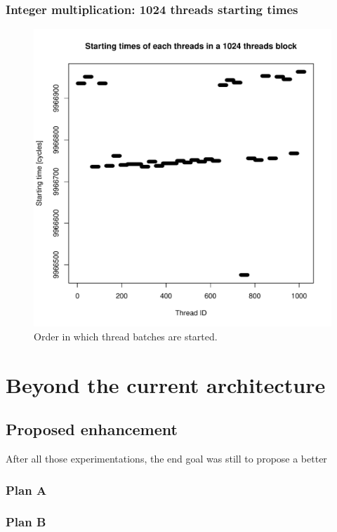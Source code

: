 \documentclass{report}
\def \scalingfactor{.8}
\begin{document}
	\subsection{Integer multiplication: 1024 threads starting times}
    \begin{figure}[H]
    		\centering
		\vspace{-20pt}
	    	\includegraphics[width=\scalingfactor\linewidth]{"graphics/starting_times_ratio31"}
	    	\vspace{-15pt}
	    	\captionsetup{justification=centering}    
	    	\caption{Order in which thread batches are started.}
    \end{figure}
\chapter{Beyond the current architecture}
   \section{Proposed enhancement}
   After all those experimentations, the end goal was still to propose a better 
   \subsection{Plan A}
   \subsection{Plan B}
\end{document}

